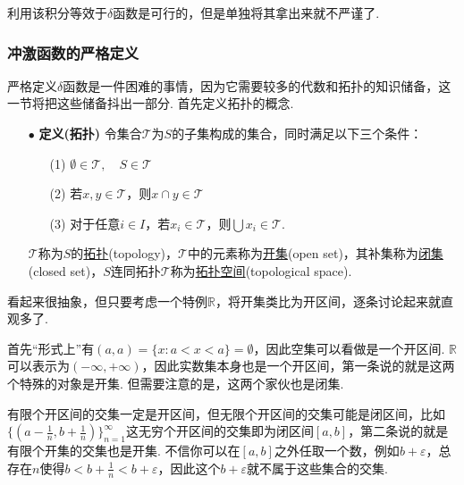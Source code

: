 \documentclass[main.tex]{subfiles}
\begin{document}
利用该积分等效于\(\delta\)函数是可行的，但是单独将其拿出来就不严谨了. 

\subsubsection{冲激函数的严格定义}

严格定义\(\delta\)函数是一件困难的事情，因为它需要较多的代数和拓扑的知识储备，这一节将把这些储备抖出一部分. 首先定义拓扑的概念.

\begin{itemize}
    \item[\(\bullet\)] \textbf{定义(拓扑)}
    \newline
    令集合\(\mathcal{T}\)为\(S\)的子集构成的集合，同时满足以下三个条件：
    \begin{itemize}
        \item [(1)] \(\emptyset \in \mathcal{T}, \quad S \in \mathcal{T}\)
        \item [(2)] 若\(x,y \in \mathcal{T}\)，则\(x \cap y \in \mathcal{T}\)
        \item [(3)] 对于任意\(i \in I\)，若\(x_i \in \mathcal{T}\)，则\(\bigcup x_i \in \mathcal{T}\).
    \end{itemize}
    \(\mathcal{T}\)称为\(S\)的\uline{拓扑}(topology)，\(\mathcal{T}\)中的元素称为\uline{开集}(open set)，其补集称为\uline{闭集}(closed set)，\(S\)连同拓扑\(\mathcal{T}\)称为\uline{拓扑空间}(topological space).
\end{itemize}

看起来很抽象，但只要考虑一个特例\(\mathbb{R}\)，将开集类比为开区间，逐条讨论起来就直观多了. 

首先“形式上”有\((a,a)=\{x: a<x<a\}=\emptyset\)，因此空集可以看做是一个开区间. \(\mathbb{R}\)可以表示为\((-\infty,+\infty)\)，因此实数集本身也是一个开区间，第一条说的就是这两个特殊的对象是开集. 但需要注意的是，这两个家伙也是闭集.

有限个开区间的交集一定是开区间，但无限个开区间的交集可能是闭区间，比如\(\{(a-\frac{1}{n}, b+\frac{1}{n})\}_{n=1}^{\infty}\)这无穷个开区间的交集即为闭区间\([a,b]\)，第二条说的就是有限个开集的交集也是开集. 不信你可以在\([a,b]\)之外任取一个数，例如\(b+\varepsilon\)，总存在\(n\)使得\(b<b+\frac{1}{n}<b+\varepsilon\)，因此这个\(b+\varepsilon\)就不属于这些集合的交集.
\end{document}
